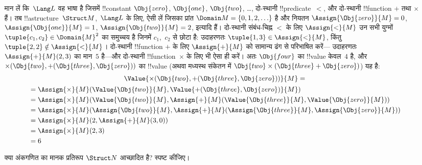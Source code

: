 \documentclass[../../../include/open-logic-section]{subfiles}
\begin{document}
\begin{ex}
मान लें कि~$\Lang L$ वह भाषा है जिसमें !!{constant} $\Obj{zero}$,
$\Obj{one}$, $\Obj{two}$, \dots, दो-स्थानी !!{predicate}~$<$, और दो-स्थानी
!!{function} $+$ तथा $\times$ हैं। तब !!a{structure}~$\Struct
M$,~$\Lang L$ के लिए, ऐसी लें जिसका प्रांत $\Domain M = \{0, 1, 2, \ldots
\}$ है और नियतन
$\Assign{\Obj{zero}}{M} = 0$, $\Assign{\Obj{one}}{M} = 1$,
$\Assign{\Obj{two}}{M} = 2$, इत्यादि हैं। दो-स्थानी संबंध-चिह्न $<$ के लिए
$\Assign{<}{M}$ उन सभी युग्मों $\tuple{c_1, c_2} \in \Domain{M}^2$ का
समुच्चय है जिनमें $c_1$,~$c_2$ से छोटा है: उदाहरणतः $\tuple{1, 3} \in
\Assign{<}{M}$, किंतु $\tuple{2, 2} \notin \Assign{<}{M}$। दो-स्थानी
!!{function} $+$ के लिए $\Assign{+}{M}$ को सामान्य ढंग से परिभाषित करें---
उदाहरणतः $\Assign{+}{M}(2,3)$ का मान~$5$ है---और दो-स्थानी
!!{function}~$\times$ के लिए भी ऐसा ही करें। अतः $\Obj{four}$ का !!{value}
केवल~$4$ है, और $\times(\Obj{two},
+(\Obj{three},\Obj{zero}))$ का !!{value} (अथवा मध्यस्थ संकेतन में
$\Obj{two} \times
(\Obj{three} + \Obj{zero})$) यह है:
\begin{multline*}
\Value{\times(\Obj{two}, +(\Obj{three},\Obj{zero}))}{M} =\\
\begin{aligned}
& =\Assign{\times}{M}(\Value{\Obj{two}}{M}, \Value{+(\Obj{three}, \Obj{zero})}{M})\\
& = \Assign{\times}{M}(\Value{\Obj{two}}{M}, \Assign{+}{M}(\Value{\Obj{three}}{M},
\Value{\Obj{zero}}{M})) \\
& = \Assign{\times}{M}(\Assign{\Obj{two}}{M}, \Assign{+}{M}(\Assign{\Obj{three}}{M},
\Assign{\Obj{zero}}{M})) \\
& = \Assign{\times}{M}(2, \Assign{+}{M}(3, 0)) \\
& = \Assign{\times}{M}(2, 3) \\
& = 6
\end{aligned}
\end{multline*}
\end{ex}

\begin{prob}
क्या अंकगणित का मानक प्रतिरूप $\Struct N$ आच्छादित है? स्पष्ट कीजिए।
\end{prob}
\end{document}
